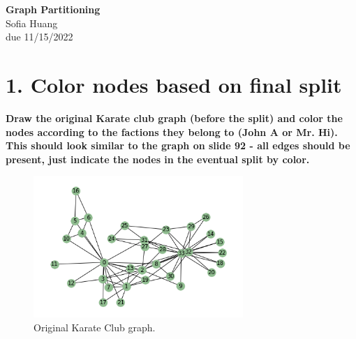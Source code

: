 \documentclass[12pt]{article}
\begin{document}
\begin{centering}
{\large\textbf{Graph Partitioning}}\\ 
Sofia Huang\\
due 11/15/2022\\
\end{centering}


\section*{1. Color nodes based on final split}
\noindent \textbf{Draw the original Karate club graph (before the split) and color the nodes according to the factions they belong to (John A or Mr. Hi). This should look similar to the graph on slide 92 - all edges should be present, just indicate the nodes in the eventual split by color.}

\begin{figure}[h]
    \centering
    \includegraphics[width=300, scale=0.75]
    {KC_original.png}
    \caption{Original Karate Club graph.}
    \label{fig:original_kc}
\end{figure}
\end{document}
